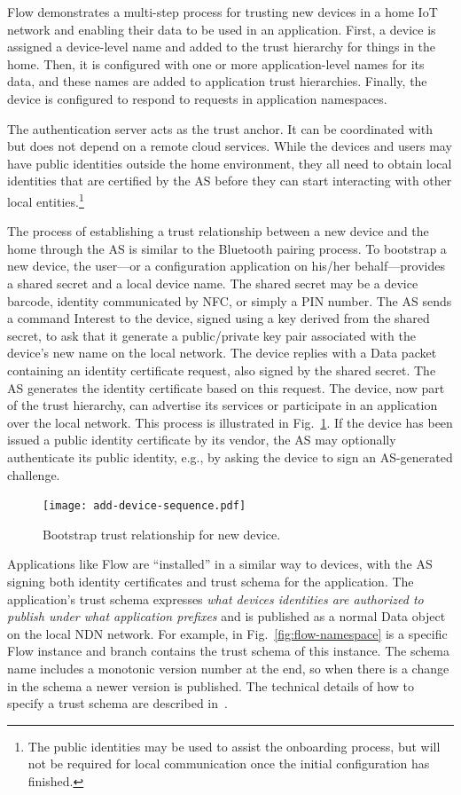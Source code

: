 Flow demonstrates a multi-step process for trusting new devices in a home IoT network and enabling their data to be used in an application. 
First, a device is assigned a device-level name and added to the trust hierarchy for things in the home. 
Then, it is configured with one or more application-level names for its data, and these names are added to application trust hierarchies. 
Finally, the device is configured to respond to requests in application namespaces. 

The authentication server acts as the trust anchor. It can be coordinated with but does not depend on a remote cloud services.
While the devices and users may have public identities outside the home environment, they all need to obtain local identities that are certified by the AS before they can start interacting with other local entities.\footnote{The public identities may be used to assist the onboarding process, but will not be required for local communication once the initial configuration has finished.}

The process of establishing a trust relationship between a new device and the home through the AS is similar to the Bluetooth pairing process.
To bootstrap a new device, the user---or a configuration application on his/her behalf---provides a shared secret and a local device name.  The shared secret may be a device barcode, identity communicated by NFC, or simply a PIN number. 
The AS sends a command Interest to the device, signed using a key derived from the shared secret, to ask that it generate a public/private key pair associated with the device's new name on the local network.  The device replies with a Data packet containing an identity certificate request, also signed by the shared secret.
The AS generates the identity certificate based on this request.  The device, now part of the trust hierarchy, can advertise its services or participate in an application over the local network.
This process is illustrated in Fig.~\ref{fig:flow-bootstrap}.
If the device has been issued a public identity certificate by its vendor, the AS may optionally authenticate its public identity, e.g., by asking the device to sign an AS-generated challenge.

\begin{figure}[!t]
\centering
\texttt{[image: add-device-sequence.pdf]}
\caption{Bootstrap trust relationship for new device.}
\label{fig:flow-bootstrap}
\end{figure}

Applications like Flow are ``installed'' in a similar way to devices, with the AS signing both identity certificates and trust schema for the application.  The application's trust schema expresses \textit{what devices identities are authorized to publish under what application prefixes} and is published as a normal Data object on the local NDN network. 
For example, in Fig.~\ref{fig:flow-namespace}  is a specific Flow instance and  branch contains the trust schema of this instance.
The schema name includes a monotonic version number at the end, so when there is a change in the schema a newer version is published.
The technical details of how to specify a trust schema are described in~\cite{trust-schema}.

